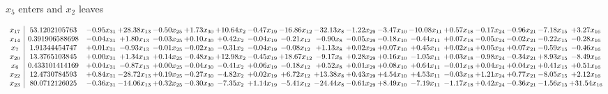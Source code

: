 \documentclass[9pt]{article}
\begin{document}
 $ x_{5} $ enters and $ x_{2} $ leaves 

 \[\begin{array}{c| c c@{\hskip 2pt} c@{\hskip 2pt} c@{\hskip 2pt} c@{\hskip 2pt} c@{\hskip 2pt} c@{\hskip 2pt} c@{\hskip 2pt} c@{\hskip 2pt} c@{\hskip 2pt} c@{\hskip 2pt} c@{\hskip 2pt} c@{\hskip 2pt} c@{\hskip 2pt} c@{\hskip 2pt} c@{\hskip 2pt} c@{\hskip 2pt} }
 x_{17}   &  53.1202105763 & -0.95 x_{31} & + 28.38 x_{13} & -0.50 x_{25} & +  1.73 x_{30} & + 10.64 x_{2} & -0.47 x_{19} & -16.86 x_{12} & -32.13 x_{8} & -1.22 x_{29} & -3.47 x_{10} & -10.08 x_{11} & +  0.57 x_{18} & -0.17 x_{24} & -0.96 x_{21} & -7.18 x_{15} & +  3.27 x_{16}\\
 x_{14}   &  0.391906588698 & -0.04 x_{31} & +  1.80 x_{13} & -0.03 x_{25} & +  0.10 x_{30} & +  0.42 x_{2} & -0.04 x_{19} & -0.21 x_{12} & -0.90 x_{8} & -0.05 x_{29} & -0.18 x_{10} & -0.44 x_{11} & +  0.07 x_{18} & -0.05 x_{24} & -0.02 x_{21} & -0.22 x_{15} & -0.28 x_{16}\\
 x_{7}   &  1.91344454747 & +  0.01 x_{31} & -0.93 x_{13} & -0.01 x_{25} & -0.02 x_{30} & -0.31 x_{2} & -0.04 x_{19} & -0.08 x_{12} & +  1.13 x_{8} & +  0.02 x_{29} & +  0.07 x_{10} & +  0.45 x_{11} & +  0.02 x_{18} & +  0.05 x_{24} & +  0.07 x_{21} & -0.59 x_{15} & -0.46 x_{16}\\
 x_{20}   &  13.3765103845 & +  0.00 x_{31} & +  1.34 x_{13} & +  0.14 x_{25} & -0.48 x_{30} & + 12.98 x_{2} & -0.45 x_{19} & + 18.67 x_{12} & -9.17 x_{8} & +  0.28 x_{29} & +  0.16 x_{10} & -1.05 x_{11} & +  0.03 x_{18} & -0.98 x_{24} & -0.34 x_{21} & +  8.93 x_{15} & -8.49 x_{16}\\
 x_{6}   &  0.433101414169 & +  0.04 x_{31} & -0.87 x_{13} & +  0.00 x_{25} & -0.04 x_{30} & -0.41 x_{2} & +  0.06 x_{19} & -0.18 x_{12} & +  0.52 x_{8} & +  0.01 x_{29} & +  0.08 x_{10} & +  0.64 x_{11} & -0.01 x_{18} & +  0.04 x_{24} & +  0.04 x_{21} & +  0.41 x_{15} & +  0.51 x_{16}\\
 x_{22}   &  12.4730784593 & +  0.84 x_{31} & -28.72 x_{13} & +  0.19 x_{25} & -0.27 x_{30} & -4.82 x_{2} & +  0.02 x_{19} & +  6.72 x_{12} & + 13.38 x_{8} & +  0.43 x_{29} & +  4.54 x_{10} & +  4.53 x_{11} & -0.03 x_{18} & +  1.21 x_{24} & +  0.77 x_{21} & -8.05 x_{15} & +  2.12 x_{16}\\
 x_{23}   &  80.0712126025 & -0.36 x_{31} & -14.06 x_{13} & +  0.32 x_{25} & -0.30 x_{30} & -7.35 x_{2} & +  1.14 x_{19} & -5.41 x_{12} & -24.44 x_{8} & -0.61 x_{29} & +  8.49 x_{10} & -7.19 x_{11} & -1.17 x_{18} & +  0.42 x_{24} & -0.36 x_{21} & -1.56 x_{15} & + 31.54 x_{16}\\

\end{array}\]
\end{document}
